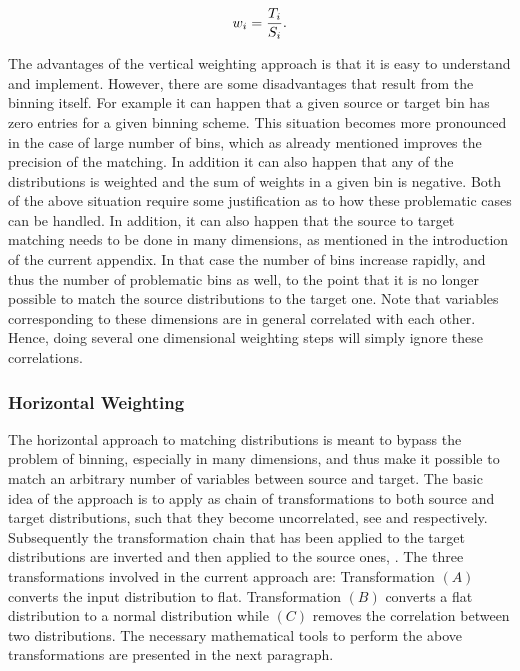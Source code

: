 \begin{equation}
  \centering
  w_i = \frac{T_i}{S_i}.
\label{vert_rew}
\end{equation}

The advantages of the vertical weighting approach is that it is easy to understand and implement.
However, there are some disadvantages that result from the binning itself. For example it can happen
that a given source or target bin has zero entries for a given binning scheme. This situation
becomes more pronounced in the case of large number of bins, which as already mentioned improves the
precision of the matching. In addition it can also happen that any of the distributions is weighted and
the sum of weights in a given bin is negative. Both of the above situation require some justification
as to how these problematic cases can be handled. In addition, it can also happen that the source to
target matching needs to be done in many dimensions, as mentioned in the introduction of the current
appendix. In that case the number of bins increase rapidly, and thus the number of problematic bins as well,
to the point that it is no longer possible to match the source distributions to the target one.
Note that variables corresponding to these dimensions are in general correlated with each other.
Hence, doing several one dimensional weighting steps will simply ignore these correlations.

\subsubsection{Horizontal Weighting}
The horizontal approach to matching distributions is meant to bypass the problem of binning, especially in many dimensions,
and thus make it possible to match an arbitrary number of variables between source
and target. The basic idea of the approach is to apply as chain of transformations to both source and target
distributions, such that they become uncorrelated, see  and 
respectively. Subsequently the transformation chain that has been applied to the target distributions
are inverted and then applied to the source ones, . The three transformations
involved in the current approach are: Transformation $(A)$ converts the input distribution to flat.
Transformation $(B)$ converts a flat distribution to a normal distribution while $(C)$ removes
the correlation between two distributions. The necessary mathematical tools to perform the above transformations
are presented in the next paragraph.

